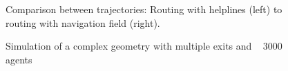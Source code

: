 \begin{figure}[h!]
\caption{Comparison between trajectories: Routing with helplines (left) to routing with navigation field (right).}
\end{figure}

\begin{figure}[h!]
\caption{Simulation of a complex geometry with multiple exits and ~ 3000 agents}
\label{fig:verteilerebene}
\end{figure}
